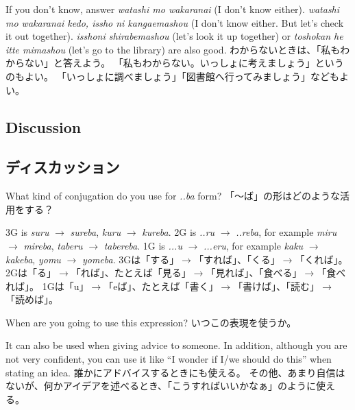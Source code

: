 \documentclass[uplatex,dvipdfmx,b5paper,english,10pt]{jsbook}
\begin{document}
\begin{toianswer}
\ifEnglish
If you don't know, answer {\it watashi mo wakaranai\/} (I don't know either).
{\it watashi mo wakaranai kedo, issho ni kangaemashou\/} (I don't know either. But let's check it out together).
{\it isshoni shirabemashou\/} (let's look it up together) or {\it toshokan he itte mimashou\/} (let's go to the library) are also good.
\else
わからないときは、「私もわからない」と答えよう。
「私もわからない。いっしょに考えましょう」というのもよい。
「いっしょに調べましょう」「図書館へ行ってみましょう」などもよい。
\fi
\end{toianswer}

\ifEnglish
\subsection{Discussion}
\else
\subsection{ディスカッション}
\fi

\begin{toiquestion}
\ifEnglish
What kind of conjugation do you use for {\it ..ba\/} form?
\else
「～ば」の形はどのような活用をする？
\fi
\end{toiquestion}
\begin{toianswer}
\ifEnglish
3G is {\it suru\/} $\rightarrow$ {\it sureba\/}, {\it kuru\/} $\rightarrow$ {\it kureba\/}.
2G is {\it ..ru\/} $\rightarrow$ {\it ..reba\/}, for example {\it miru\/} $\rightarrow$ {\it mireba\/}, {\it taberu\/} $\rightarrow$ {\it tabereba\/}.
1G is {\it ...u\/} $\rightarrow$ {\it ...eru\/}, for example {\it kaku\/} $\rightarrow$ {\it kakeba\/}, {\it yomu\/} $\rightarrow$ {\it yomeba\/}.
\else
3Gは「する」$\rightarrow$「すれば」、「くる」$\rightarrow$「くれば」。
2Gは「る」$\rightarrow$「れば」、たとえば「見る」$\rightarrow$「見れば」、「食べる」$\rightarrow$「食べれば」。
1Gは「u」$\rightarrow$「eば」、たとえば「書く」$\rightarrow$「書けば」、「読む」$\rightarrow$「読めば」。
\fi
\label{v-ba}
\end{toianswer}

\begin{toiquestion}
\ifEnglish
When are you going to use this expression?
\else
いつこの表現を使うか。
\fi
\end{toiquestion}
\begin{toianswer}
\ifEnglish
It can also be used when giving advice to someone.
In addition, although you are not very confident, you can use it like ``I wonder if I/we should do this'' when stating an idea.
\else
誰かにアドバイスするときにも使える。
その他、あまり自信はないが、何かアイデアを述べるとき、「こうすればいいかなぁ」のように使える。
\fi
\end{toianswer}
\end{document}
